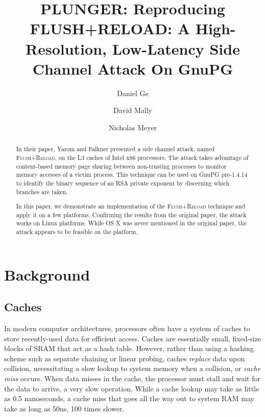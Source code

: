 \documentclass[11pt]{llncs}
\newcommand{\flushreload}{\textsc{Flush}+\textsc{Reload}}
\begin{document}
\title{PLUNGER: Reproducing FLUSH+RELOAD: A High-Resolution, Low-Latency Side
Channel Attack On GnuPG}
\author{Daniel Ge \and David Mally \and Nicholas Meyer}
\maketitle

\lobwatermark

\begin{abstract}

    In their paper, Yarom and Falkner\cite{YF13} presented a side channel
    attack, named \flushreload{}, on the L3 caches of Intel x86 processors. The
    attack takes advantage of content-based memory page sharing between
    non-trusting processes to monitor memory accesses of a victim process. This
    technique can be used on GnuPG pre-1.4.14 to identify the binary sequence of
    an RSA private exponent by discerning which branches are taken.

    In this paper, we demonstrate an implementation of the \flushreload{}
    technique and apply it on a few platforms. Confirming the results from the
    original paper, the attack works on Linux platforms. While OS X was never
    mentioned in the original paper, the attack appears to be feasible on the
    platform.

\end{abstract}

\section{Background}
\subsection{Caches}

In modern computer architectures, processors often have a system of caches to
store recently-used data for efficient access. Caches are essentially small,
fixed-size blocks of SRAM that act as a hash table. However, rather than using a
hashing scheme such as separate chaining or linear probing, caches
\textit{replace} data upon collision, necessitating a slow lookup to system
memory when a collision, or \textit{cache miss} occurs. When data misses in the
cache, the processor must stall and wait for the data to arrive, a very slow
operation. While a cache lookup may take as little as 0.5 nanoseconds, a cache
miss that goes all the way out to system RAM may take as long as 50ns, 100 times
slower.
\end{document}
